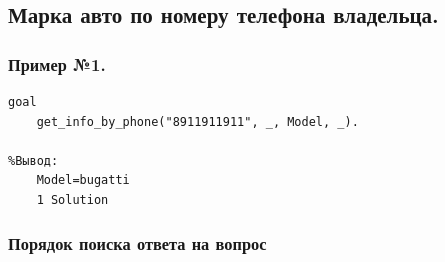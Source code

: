 \documentclass[a4paper,12pt]{article}
\begin{document}
\newpage
	
	\subsection*{Марка авто по номеру телефона владельца.}
	
	\subsubsection*{Пример №1.}
	
	\begin{verbatim}
goal
	get_info_by_phone("8911911911", _, Model, _).
	
%Вывод:
	Model=bugatti
	1 Solution
	\end{verbatim}
	
	\subsubsection*{Порядок поиска ответа на вопрос}
	
\end{document}
